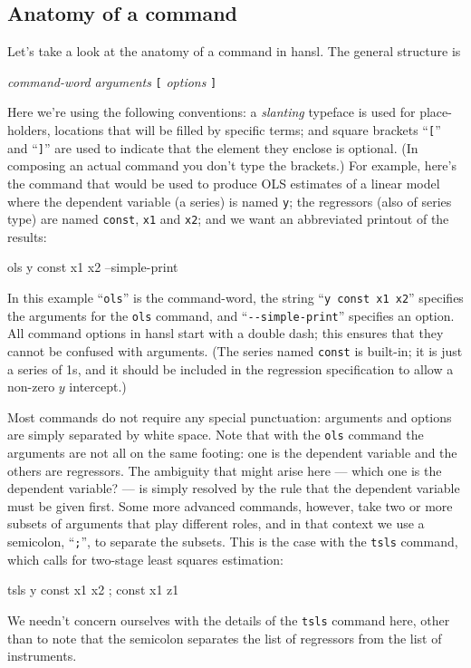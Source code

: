 \subsection{Anatomy of a command}

Let's take a look at the anatomy of a command in hansl. The general
structure is

\quad \textsl{command-word} \textsl{arguments} \texttt{[} \textsl{options}
\texttt{]}

Here we're using the following conventions: a \textsl{slanting}
typeface is used for place-holders, locations that will be filled by
specific terms; and square brackets ``\texttt{[}'' and ``\texttt{]}''
are used to indicate that the element they enclose is optional. (In
composing an actual command you don't type the brackets.) For example,
here's the command that would be used to produce OLS estimates of a
linear model where the dependent variable (a series) is named
\texttt{y}; the regressors (also of series type) are named
\texttt{const}, \texttt{x1} and \texttt{x2}; and we want an
abbreviated printout of the results:
%
\begin{code}
ols y const x1 x2 --simple-print
\end{code}
%
In this example ``\texttt{ols}'' is the command-word, the string
``\texttt{y const x1 x2}'' specifies the arguments for the
\texttt{ols} command, and ``\verb|--simple-print|'' specifies an
option.  All command options in hansl start with a double dash; this
ensures that they cannot be confused with arguments.  (The series
named \texttt{const} is built-in; it is just a series of 1s, and it
should be included in the regression specification to allow a non-zero
$y$ intercept.)

Most commands do not require any special punctuation: arguments and
options are simply separated by white space. Note that with the
\texttt{ols} command the arguments are not all on the same footing:
one is the dependent variable and the others are regressors. The
ambiguity that might arise here --- which one is the dependent
variable? --- is simply resolved by the rule that the dependent
variable must be given first. Some more advanced commands, however,
take two or more subsets of arguments that play different roles, and
in that context we use a semicolon, ``\texttt{;}'', to separate the
subsets. This is the case with the \texttt{tsls} command, which calls
for two-stage least squares estimation:
%
\begin{code}
tsls y const x1 x2 ; const x1 z1
\end{code}
%
We needn't concern ourselves with the details of the \texttt{tsls}
command here, other than to note that the semicolon separates the list
of regressors from the list of instruments.

